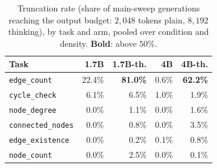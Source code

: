 \documentclass[11pt]{article}
\begin{document}
\begin{table}[H]
\centering
\footnotesize
\setlength{\tabcolsep}{3.2pt}
\caption{Shortcut bars on $500$ graphs from the published $5$--$19$-node
generator, used for the screened arms. At $n{=}40$
(Table~\ref{tab:shortcut}) the \texttt{edge\_existence}/\texttt{none} bar
rises to $0.735$ through class imbalance, and \texttt{degree}'s gap over
\texttt{none} on that task falls from $+0.296$ to $+0.011$.}
\label{tab:shortcut-published}
\end{table}

\begin{table}[H]
\centering
\footnotesize
\setlength{\tabcolsep}{3pt}
\begin{tabular}{lrrrr}
\toprule
Task & 1.7B & 1.7B-th. & 4B & 4B-th. \\
\midrule
\texttt{edge\_count}     & 22.4\% & \textbf{81.0\%} & 0.6\% & \textbf{62.2\%} \\
\texttt{cycle\_check}    & 6.1\%  & 6.5\%  & 1.0\%  & 1.9\% \\
\texttt{node\_degree}    & 0.0\%  & 1.1\%  & 0.0\%  & 1.6\% \\
\texttt{connected\_nodes}& 0.0\%  & 0.8\%  & 0.0\%  & 3.5\% \\
\texttt{edge\_existence} & 0.0\%  & 0.2\%  & 0.1\%  & 0.8\% \\
\texttt{node\_count}     & 0.0\%  & 2.5\%  & 0.0\%  & 0.1\% \\
\bottomrule
\end{tabular}
\caption{Truncation rate (share of main-sweep generations reaching the
output budget: $2{,}048$ tokens plain, $8{,}192$ thinking), by task and
arm, pooled over condition and density. \textbf{Bold}: above $50\%$.}
\label{tab:hitcap}
\end{table}
\end{document}
